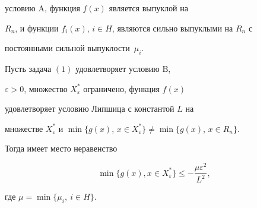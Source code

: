 условию A, функция $f(x)$ является выпуклой на


$R_n$, и функции $f_i(x)$, $i\in H$, являются сильно выпуклыми на $R_n$ с 


постоянными сильной выпуклости~$\mu_i$.





\begin{thm}


Пусть задача $(1)$ удовлетворяет условию $\mathrm B$,


$\varepsilon>0$, множество $X_{\varepsilon}^*$ ограничено, функция $f(x)$ 


удовлетворяет условию Липшица с константой $L$ на


множестве $X_{\varepsilon}^*$ и $\min\{g(x)$, $x\in


X_{\varepsilon}^*\}\ne\min\{g(x)$, $x\in R_n\}$.


Тогда имеет место неравенство


\begin{equation}


\min\{g(x), x\in X_{\varepsilon}^*\}\le-\frac{\mu\varepsilon^2}{L^2},


\end{equation}


где $\mu=\min\{\mu_i,\ i\in H\}$.


\end{thm}





